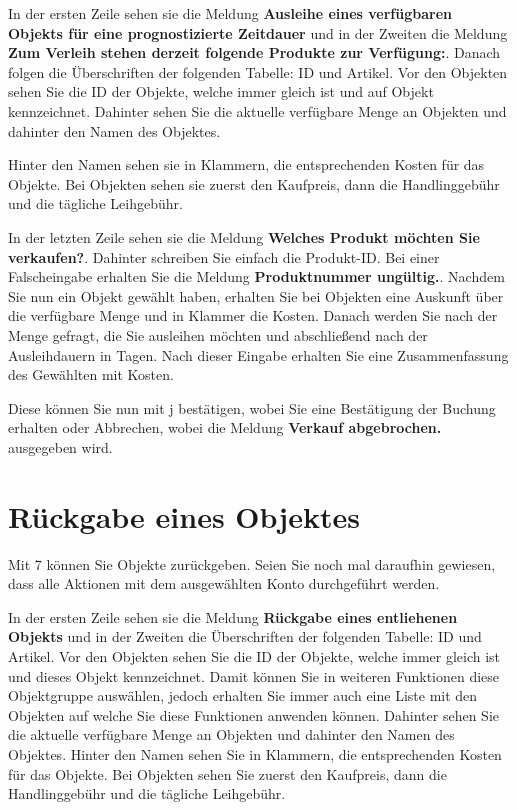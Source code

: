 ﻿\documentclass[a4paper,12pt,titlepage]{article}
\newcommand\enquote[1]{{\ttfamily \bfseries #1}}
\begin{document}
In der ersten Zeile sehen sie die Meldung \enquote{Ausleihe eines verfügbaren Objekts für eine prognostizierte Zeitdauer}
 und in der Zweiten die Meldung \enquote{Zum Verleih stehen derzeit folgende Produkte zur Verfügung:}.
Danach folgen die Überschriften der folgenden Tabelle: ID und Artikel.
Vor den Objekten sehen Sie die ID der Objekte, welche immer gleich ist und auf Objekt kennzeichnet. 
Dahinter sehen Sie die aktuelle verfügbare Menge an Objekten und dahinter den Namen des Objektes.

Hinter den Namen sehen sie in Klammern, die entsprechenden Kosten für das Objekte.
Bei Objekten sehen sie zuerst den Kaufpreis, dann die Handlinggebühr und die tägliche Leihgebühr.

In der letzten Zeile sehen sie die Meldung \enquote{Welches Produkt möchten Sie verkaufen?}.
Dahinter schreiben Sie einfach die Produkt-ID.
Bei einer Falscheingabe erhalten Sie die Meldung \enquote{Produktnummer ungültig.}.
Nachdem Sie nun ein Objekt gewählt haben,
 erhalten Sie bei Objekten eine Auskunft über die verfügbare Menge und in Klammer die Kosten.
Danach werden Sie nach der Menge gefragt, die Sie ausleihen möchten und abschließend nach der Ausleihdauern in Tagen.
Nach dieser Eingabe erhalten Sie eine Zusammenfassung des Gewählten mit Kosten.

Diese können Sie nun mit j bestätigen, wobei Sie eine Bestätigung der Buchung erhalten oder Abbrechen,
 wobei die Meldung \enquote{Verkauf abgebrochen.} ausgegeben wird.

\section{Rückgabe eines Objektes}
Mit 7 können Sie Objekte zurückgeben.
Seien Sie noch mal daraufhin gewiesen, dass alle Aktionen mit dem ausgewählten Konto durchgeführt werden.

In der ersten Zeile sehen sie die Meldung \enquote{Rückgabe eines entliehenen Objekts}
 und in der Zweiten die Überschriften der folgenden Tabelle: ID und Artikel.
Vor den Objekten sehen Sie die ID der Objekte, welche immer gleich ist und dieses Objekt kennzeichnet.
Damit können Sie in weiteren Funktionen diese Objektgruppe auswählen,
 jedoch erhalten Sie immer auch eine Liste mit den Objekten auf welche Sie diese Funktionen anwenden können.
Dahinter sehen Sie die aktuelle verfügbare Menge an Objekten und dahinter den Namen des Objektes.
Hinter den Namen sehen Sie in Klammern, die entsprechenden Kosten für das Objekte.
Bei Objekten sehen Sie zuerst den Kaufpreis, dann die Handlinggebühr und die tägliche Leihgebühr.
\end{document}

